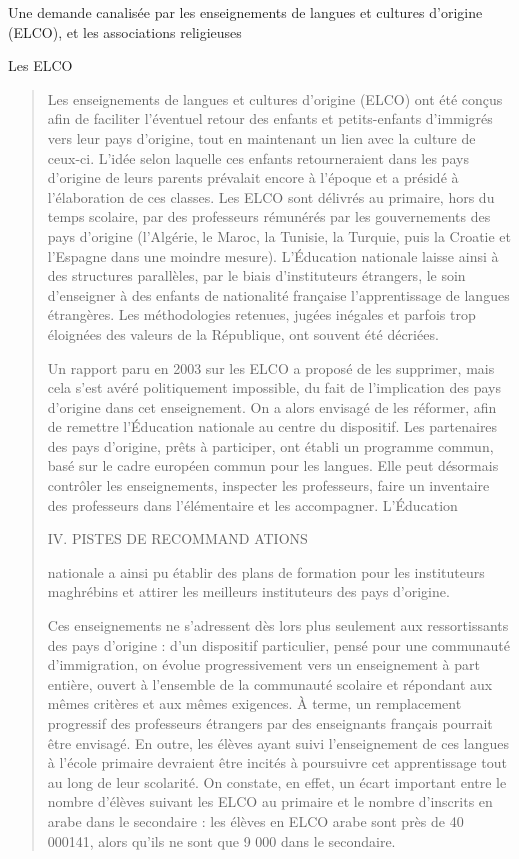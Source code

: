 Une demande canalisée par les enseignements de langues et cultures
d'origine (ELCO), et les associations religieuses

Les ELCO

\begin{quote}
Les enseignements de langues et cultures d'origine (ELCO) ont été conçus
afin de faciliter l'éventuel retour des enfants et petits-enfants
d'immigrés vers leur pays d'origine, tout en maintenant un lien avec la
culture de ceux-ci. L'idée selon laquelle ces enfants retourneraient
dans les pays d'origine de leurs parents prévalait encore à l'époque et
a présidé à l'élaboration de ces classes. Les ELCO sont délivrés au
primaire, hors du temps scolaire, par des professeurs rémunérés par les
gouvernements des pays d'origine (l'Algérie, le Maroc, la Tunisie, la
Turquie, puis la Croatie et l'Espagne dans une moindre mesure).
L'Éducation nationale laisse ainsi à des structures parallèles, par le
biais d'instituteurs étrangers, le soin d'enseigner à des enfants de
nationalité française l'apprentissage de langues étrangères. Les
méthodologies retenues, jugées inégales et parfois trop éloignées des
valeurs de la République, ont souvent été décriées.

Un rapport paru en 2003 sur les ELCO a proposé de les supprimer, mais
cela s'est avéré politiquement impossible, du fait de l'implication des
pays d'origine dans cet enseignement. On a alors envisagé de les
réformer, afin de remettre l'Éducation nationale au centre du
dispositif. Les partenaires des pays d'origine, prêts à participer, ont
établi un programme commun, basé sur le cadre européen commun pour les
langues. Elle peut désormais contrôler les enseignements, inspecter les
professeurs, faire un inventaire des professeurs dans l'élémentaire et
les accompagner. L'Éducation

IV. PISTES DE RECOMMAND ATIONS

nationale a ainsi pu établir des plans de formation pour les
instituteurs maghrébins et attirer les meilleurs instituteurs des pays
d'origine.

Ces enseignements ne s'adressent dès lors plus seulement aux
ressortissants des pays d'origine : d'un dispositif particulier, pensé
pour une communauté d'immigration, on évolue progressivement vers un
enseignement à part entière, ouvert à l'ensemble de la communauté
scolaire et répondant aux mêmes critères et aux mêmes exigences. À
terme, un remplacement progressif des professeurs étrangers par des
enseignants français pourrait être envisagé. En outre, les élèves ayant
suivi l'enseignement de ces langues à l'école primaire devraient être
incités à poursuivre cet apprentissage tout au long de leur scolarité.
On constate, en effet, un écart important entre le nombre d'élèves
suivant les ELCO au primaire et le nombre d'inscrits en arabe dans le
secondaire : les élèves en ELCO arabe sont près de 40 000141, alors
qu'ils ne sont que 9 000 dans le secondaire.
\end{quote}

